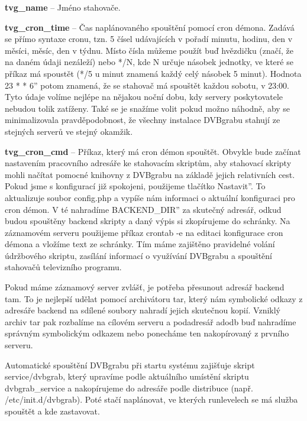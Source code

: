 \bitem
\item\textbf{tvg\_name} -- Jméno stahovače.
\item\textbf{tvg\_cron\_time} -- Čas naplánovaného spouštění pomocí cron démona. Zadává se přímo syntaxe cronu, tzn. 5 čísel udávajících v pořadí minutu, hodinu, den v měsíci, měsíc, den v týdnu. Místo čísla můžeme použít buď hvězdičku (značí, že na daném údaji nezáleží) nebo */N, kde N určuje násobek jednotky, ve které se příkaz má spoustět (*/5 u minut znamená každý celý násobek 5 minut). Hodnota  23 * * 6'' potom znamená, že se stahovač má spouštět každou sobotu, v 23:00. Tyto údaje volíme nejlépe na nějakou noční dobu, kdy servery poskytovatele nebudou tolik zatíženy. Také se je snažíme volit pokud možno náhodně, aby se minimalizovala pravděpodobnost, že všechny instalace DVBgrabu stahují ze stejných serverů ve stejný okamžik.
\item\textbf{tvg\_cron\_cmd} -- Příkaz, který má cron démon spouštět. Obvykle bude začínat nastavením pracovního adresáře ke stahovacím skriptům, aby stahovací skripty mohli načítat pomocné knihovny z DVBgrabu na základě jejich relativních cest.
\eitem
\pagebreak
Pokud jsme s konfigurací již spokojeni, použijeme tlačítko \quotedblbase Nastavit''. To aktualizuje soubor config.php a vypíše nám informaci o aktuální konfiguraci pro cron démon. V té nahradíme \quotedblbase BACKEND\_DIR'' za skutečný adresář, odkud budou spouštěny backend skripty a daný výpis si zkopírujeme do schránky. Na záznamovém serveru použijeme příkaz crontab -e na editaci konfigurace cron démona a vložíme text ze schránky. Tím máme zajištěno pravidelné volání údržbového skriptu, zasílání informací o využívání DVBgrabu a spouštění stahovačů televizního programu.

Pokud máme záznamový server zvlášť, je potřeba přesunout adresář backend tam. To je nejlepší udělat pomocí archivátoru tar, který nám symbolické odkazy z adresáře backend na sdílené soubory nahradí jejich skutečnou kopií. Vzniklý archiv tar pak rozbalíme na cílovém serveru a podadresář adodb buď nahradíme správným symbolickým odkazem nebo ponecháme ten nakopírovaný z prvního serveru.

Automatické spouštění DVBgrabu při startu systému zajišťuje skript service/dvbgrab, který upravíme podle aktuálního umístění skriptu dvbgrab\_service a nakopírujeme do adresáře podle distribuce (např. /etc/init.d/dvbgrab). Poté stačí naplánovat, ve kterých runlevelech se má služba spouštět a kde zastavovat.


